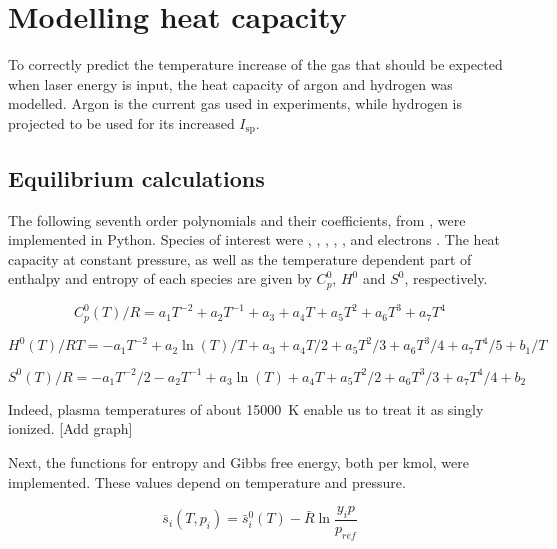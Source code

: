 \chapter{Modelling heat capacity} \label{chp:models}
    
    To correctly predict the temperature increase of the gas that should be expected when laser energy is input, the heat capacity of argon and hydrogen was modelled. Argon is the current gas used in experiments, while hydrogen is projected to be used for its increased $I_\mathrm{sp}$.

    \section{Equilibrium calculations} \label{sec:equilibrium calcs}
        
        The following seventh order polynomials and their coefficients, from \textcite{mcbrideNASAGlennCoefficients2002}, were implemented in Python. Species of interest were , , , , , and electrons . The heat capacity at constant pressure, as well as the temperature dependent part of enthalpy and entropy of each species are given by $C_p^0$, $H^0$ and $S^0$, respectively.

        \begin{equation}
            C_p^0 (T)/R = a_1 T^{-2} + a_2 T^{-1} + a_3 + a_4   T + a_5 T^2 + a_6 T^3 + a_7 T^4
        \end{equation} 
        
        \begin{equation}
            H^0 (T)/RT = -a_1 T^{-2} + a_2 \ln(T)/T + a_3 + a_4 T / 2 + a_5 {T^2}/3 + a_6 {T^3}/4 + a_7 {T^4}/5 + b_1/T
        \end{equation}
        
        \begin{equation}
            S^0(T)/R = -a_1 T^{-2}/2 - a_2 T^{-1} + a_3\ln(T) + a_4   T + a_5 {T^2}/2 + a_6 T^3/3 + a_7 T^4/4 + b_2
        \end{equation}

        Indeed, plasma temperatures of about \qty{15000}{K} enable us to treat it as singly ionized. [Add graph]

        Next, the functions for entropy and Gibbs free energy, both per \unit{kmol}, were implemented. These values depend on temperature and pressure. 
        
        \begin{equation}
            \bar s_i (T, p_i) = \bar s_i^0 (T) - \bar R \ln \frac{y_i p}{p_{ref}}
        \end{equation}

